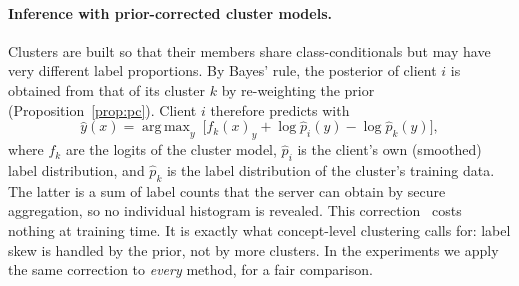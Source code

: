 \documentclass[11pt]{article}
\theoremstyle{definition}
\theoremstyle{remark}
\DeclareMathOperator*{\argmax}{arg\,max}
\begin{document}
\paragraph{Inference with prior-corrected cluster models.}\label{sec:pc}
Clusters are built so that their members share class-conditionals but may have very different label proportions. By Bayes' rule, the posterior of client $i$ is obtained from that of its cluster $k$ by re-weighting the prior (Proposition~\ref{prop:pc}). Client $i$ therefore predicts with
\begin{equation}\label{eq:pc}
\hat y(x)=\argmax_y\ \big[f_k(x)_y+\log\hat p_i(y)-\log\hat p_k(y)\big],
\end{equation}
where $f_k$ are the logits of the cluster model, $\hat p_i$ is the client's own (smoothed) label distribution, and $\hat p_k$ is the label distribution of the cluster's training data. The latter is a sum of label counts that the server can obtain by secure aggregation, so no individual histogram is revealed. This correction~\citep{lipton2018labelshift,menon2021logit} costs nothing at training time. It is exactly what concept-level clustering calls for: label skew is handled by the prior, not by more clusters. In the experiments we apply the same correction to \emph{every} method, for a fair comparison.
\end{document}
